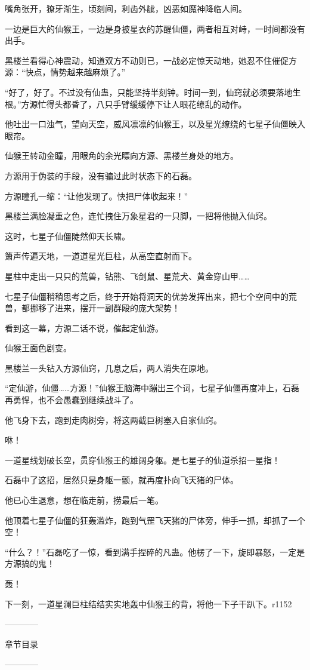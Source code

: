 \begin{this_body}
嘴角张开，獠牙渐生，顷刻间，利齿外龇，凶恶如魔神降临人间。

一边是巨大的仙猴王，一边是身披星衣的苏醒仙僵，两者相互对峙，一时间都没有出手。

黑楼兰看得心神震动，知道双方不动则已，一战必定惊天动地，她忍不住催促方源：“快点，情势越来越麻烦了。”

“好了，好了。不过没有仙蛊，只能坚持半刻钟。时间一到，仙窍就必须要落地生根。”方源忙得头都昏了，八只手臂缓缓停下让人眼花缭乱的动作。

他吐出一口浊气，望向天空，威风凛凛的仙猴王，以及星光缭绕的七星子仙僵映入眼帘。

仙猴王转动金瞳，用眼角的余光瞟向方源、黑楼兰身处的地方。

方源用于伪装的手段，没有骗过此时状态下的石磊。

方源瞳孔一缩：“让他发现了。快把尸体收起来！”

黑楼兰满脸凝重之色，连忙拽住万象星君的一只脚，一把将他抛入仙窍。

这时，七星子仙僵陡然仰天长啸。

箫声传遍天地，一道道星光巨柱，从高空直射而下。

星柱中走出一只只的荒兽，钻熊、飞剑鼠、星荒犬、黄金穿山甲……

七星子仙僵稍稍思考之后，终于开始将洞天的优势发挥出来，把七个空间中的荒兽，都挪移了进来，摆开一副群殴的庞大架势！

看到这一幕，方源二话不说，催起定仙游。

仙猴王面色剧变。

黑楼兰一头钻入方源仙窍，几息之后，两人消失在原地。

“定仙游，仙僵……方源！”仙猴王脑海中蹦出三个词，七星子仙僵再度冲上，石磊再勇悍，也不会愚蠢到继续战斗了。

他飞身下去，跑到走肉树旁，将这两截巨树塞入自家仙窍。

咻！

一道星线划破长空，贯穿仙猴王的雄阔身躯。是七星子的仙道杀招一星指！

石磊中了这招，居然只是身躯一颤，就再度扑向飞天猪的尸体。

他已心生退意，想在临走前，捞最后一笔。

他顶着七星子仙僵的狂轰滥炸，跑到气罡飞天猪的尸体旁，伸手一抓，却抓了一个空！

“什么？！”石磊吃了一惊，看到满手捏碎的凡蛊。他楞了一下，旋即暴怒，一定是方源搞的鬼！

轰！

下一刻，一道星澜巨柱结结实实地轰中仙猴王的背，将他一下子干趴下。r1152

------------

章节目录

------------

\end{this_body}

